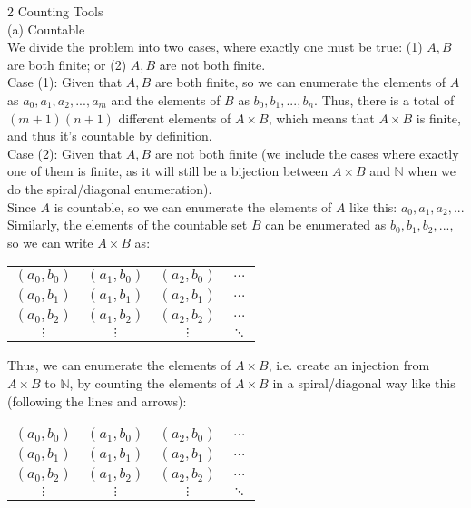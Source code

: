 \documentclass{article}
\begin{document}
{\Large 2 Counting Tools} \\[.5cm]
(a) Countable \\

We divide the problem into two cases, where exactly one must be true: (1) $A, B$ are both finite; or (2) $A, B$ are not both finite. \\

Case (1): Given that $A, B$ are both finite, so we can enumerate the elements of $A$ as $a_0, a_1, a_2, ..., a_m$ and the elements of $B$ as $b_0, b_1, ..., b_n$. Thus, there is a total of $(m+1)(n+1)$ different elements of $A\times B$, which means that $A\times B$ is finite, and thus it's countable by definition. \\

Case (2): Given that $A, B$ are not both finite (we include the cases where exactly one of them is finite, as it will still be a bijection between $A\times B$ and $\mathbb{N}$ when we do the spiral/diagonal enumeration). \\[.2cm]
\indent Since $A$ is countable, so we can enumerate the elements of $A$ like this: $a_0, a_1, a_2, ...$ Similarly, the elements of the countable set $B$ can be enumerated as $b_0, b_1, b_2, ...$, so we can write $A\times B$ as:
\begin{center}
\begin{tabular} { c c c c }
    $(a_0, b_0)$ & $(a_1, b_0)$ & $(a_2, b_0)$ & $\dots$ \\
    $(a_0, b_1)$ & $(a_1, b_1)$ & $(a_2, b_1)$ & $\dots$ \\
    $(a_0, b_2)$ & $(a_1, b_2)$ & $(a_2, b_2)$ & $\dots$ \\
    $\vdots$ & $\vdots$ & $\vdots$ & $\ddots$
\end{tabular}
\end{center}

Thus, we can enumerate the elements of $A\times B$, i.e. create an injection from $A\times B$ to $\mathbb{N}$, by counting the elements of $A\times B$ in a spiral/diagonal way like this (following the lines and arrows):
\begin{center}
\begin{tabular} { c c c c }
    $(a_0, b_0)$ & $(a_1, b_0)$ & $(a_2, b_0)$ & $\dots$ \\[.1cm]
    $(a_0, b_1)$ & $(a_1, b_1)$ & $(a_2, b_1)$ & $\dots$ \\[.1cm]
    $(a_0, b_2)$ & $(a_1, b_2)$ & $(a_2, b_2)$ & $\dots$ \\[.1cm]
    $\vdots$ & $\vdots$ & $\vdots$ & $\ddots$
\end{tabular}
\end{center}
\end{document}
